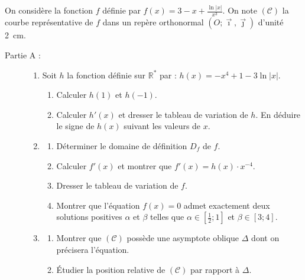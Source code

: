 \begin{exo}
      On consid\`ere la fonction $f$ d\'efinie par $f(x) = \displaystyle{ 3 - x + \frac{\ln |x|}{x^3} }$.
      On note $(\mathscr{C})$ la courbe repr\'esentative de $f$ dans un rep\`ere 
      orthonormal $(O ; \vec{\imath} , \vec{\jmath} )$ d'unit\'e 2~cm.
      \begin{description}
            \item[Partie A :]
                  \begin{enumerate}
                        \item Soit $h$ la fonction d\'efinie sur $\mathbb{R}^*$ par : 
                              $h(x) = - x^4 + 1 - 3 \ln |x|$.
                              \begin{enumerate}
                                    \item Calculer $h(1)$ et $h(-1)$.
                                    \item Calculer $h'(x)$ et dresser le tableau de variation de $h$.
                                          En d\'eduire le signe de $h(x)$ suivant les valeurs de $x$.
                              \end{enumerate}
                        \item \begin{enumerate}
                                    \item D\'eterminer le domaine de d\'efinition $D_f$ de $f$.
                                    \item Calculer $f'(x)$ et montrer que $f'(x) = h(x) \cdot x^{-4}$.
                                    \item Dresser le tableau de variation de $f$.
                                    \item Montrer que l'\'equation $f(x) = 0$ admet exactement deux solutions 
                                          positives $\alpha$ et $\beta$ telles que
                                          $\alpha \in [\frac{1}{2} ; 1]$ et $\beta \in [3 ; 4]$.
                              \end{enumerate}
                        \item \begin{enumerate}
                                    \item Montrer que $(\mathscr{C})$ poss\`ede une asymptote oblique $\Delta$ 
                                          dont on pr\'ecisera l'\'equation.
                                    \item \'Etudier la position relative de $(\mathscr{C})$ par rapport \`a $\Delta$.

\end{enumerate}
\end{enumerate}
\end{description}
\end{exo}
